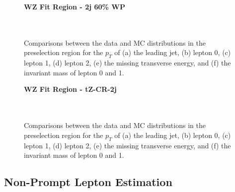 \begin{figure}[H]
    \centering
    \textbf{WZ Fit Region - 2j 60\% WP}\\
    \\
    \\
    \caption{Comparisons between the data and MC distributions in the preselection region for the $p_T$ of (a) the leading jet, (b) lepton 0, (c) lepton 1, (d) lepton 2, (e) the missing transverse energy, and (f) the invariant mass of lepton 0 and 1.}
    \label{kin:WP_2j_60}
\end{figure}

\begin{figure}[H]
    \textbf{WZ Fit Region - tZ-CR-2j}\\
    \\
    \\
    \caption{Comparisons between the data and MC distributions in the preselection region for the $p_T$ of (a) the leading jet, (b) lepton 0, (c) lepton 1, (d) lepton 2, (e) the missing transverse energy, and (f) the invariant mass of lepton 0 and 1.}
    \label{kin:tZ_CR_2j}
\end{figure}

\subsection{Non-Prompt Lepton Estimation}
\label{sec:fakes}

